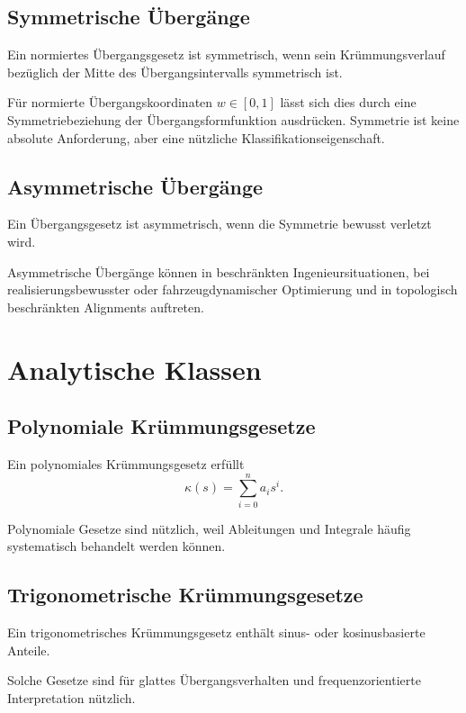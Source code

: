 \subsection{Symmetrische Übergänge}
\begin{definition}
\label{def:symmetric-transition}
Ein normiertes Übergangsgesetz ist symmetrisch, wenn sein Krümmungsverlauf
bezüglich der Mitte des Übergangsintervalls symmetrisch ist.
\end{definition}
Für normierte Übergangskoordinaten \(w\in[0,1]\) lässt sich dies durch eine
Symmetriebeziehung der Übergangsformfunktion ausdrücken. Symmetrie ist keine
absolute Anforderung, aber eine nützliche Klassifikationseigenschaft.

\subsection{Asymmetrische Übergänge}
\begin{definition}
\label{def:asymmetric-transition}
Ein Übergangsgesetz ist asymmetrisch, wenn die Symmetrie bewusst verletzt
wird.
\end{definition}
Asymmetrische Übergänge können in beschränkten Ingenieursituationen, bei
realisierungsbewusster oder fahrzeugdynamischer Optimierung und in
topologisch beschränkten Alignments auftreten.

\section{Analytische Klassen}

\subsection{Polynomiale Krümmungsgesetze}
\begin{definition}
\label{def:polynomial-curvature}
Ein polynomiales Krümmungsgesetz erfüllt
\[
\kappa(s)=\sum_{i=0}^n a_i s^i.
\]
\end{definition}
Polynomiale Gesetze sind nützlich, weil Ableitungen und Integrale häufig
systematisch behandelt werden können.

\subsection{Trigonometrische Krümmungsgesetze}
\begin{definition}
\label{def:trigonometric-curvature}
Ein trigonometrisches Krümmungsgesetz enthält sinus- oder kosinusbasierte
Anteile.
\end{definition}
Solche Gesetze sind für glattes Übergangsverhalten und frequenzorientierte
Interpretation nützlich.

